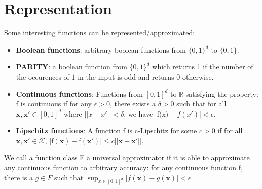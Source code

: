 \documentclass{article}
\begin{document}
   \section{Representation}
   Some interesting functions can be represented/approximated:
   \begin{itemize}
   \item \textbf{Boolean functions}: arbitrary boolean functions from $\{0,1\}^d$ to $\{0,1\}$.
   \item \textbf{PARITY}: a boolean function from $\{0,1\}^d$ which returns 1 if the number of the occurences of $1$ in the input is odd and returns $0$ otherwise. 
   \item \textbf{Continuous functions}: Functions from $[0,1]^d$ to $\mathbb{R}$ satisfying the property: f is continuous if for any $\epsilon > 0$, there exists a $\delta > 0$ such that for all $\textbf{x},\textbf{x}' \in [0,1]^d$ where $||x-x'||<\delta$, we have $|\text{f(x)}-f(x')|<\epsilon.$
   \item \textbf{Lipschitz functions}: A function f is c-Lipschitz for some $c > 0$ if for all $\textbf{x},\textbf{x}' \in \mathcal{X}$, $|\text{f}(\textbf{x}) - \text{f}(\textbf{x}')| \leq c||\textbf{x}-\textbf{x}'||$.
   \end{itemize}
   We call a function class F a universal approximator if it is able to approximate any continuous function to arbitrary accuracy: for any continuous function f, there is a $g \in F$ such that $\sup_{x\in [0,1]^d} |f(\textbf{x})-g(\textbf{x})|<\epsilon$.
   
\end{document}
